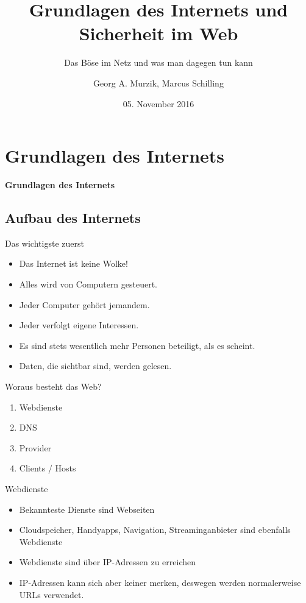 \documentclass[hyperref={colorlinks,linkcolor=white}, utf8]{beamer}
\title{Grundlagen des Internets und Sicherheit im Web}
\subtitle{Das Böse im Netz und was man dagegen tun kann} %
\author{Georg A. Murzik, Marcus Schilling}
\institute{Terminal.21}
\date{05. November 2016}
\begin{document}
	
	\begin{frame}
		\titlepage
	\end{frame}
	
	\section{Grundlagen des Internets}
	\begin{frame}
		\centering \huge \textbf{Grundlagen des Internets}
	\end{frame}
	
	\subsection{Aufbau des Internets}
	\begin{frame}{Das wichtigste zuerst}
		\begin{itemize}
			\item Das Internet ist keine Wolke!
			\item Alles wird von Computern gesteuert.
			\item Jeder Computer gehört jemandem.
			\item Jeder verfolgt eigene Interessen.
			\item Es sind stets wesentlich mehr Personen beteiligt, als es scheint.				\item Daten, die sichtbar sind, werden gelesen.	
		\end{itemize}		
	\end{frame}
	
	\begin{frame}{Woraus besteht das Web?}
		\begin{enumerate}
			\item Webdienste
			\item DNS
			\item Provider
			\item Clients / Hosts
		\end{enumerate}
	\end{frame}
		
	\begin{frame}{Webdienste}
		\begin{itemize}
			\item Bekannteste Dienste sind Webseiten
			\item Cloudspeicher, Handyapps, Navigation, Streaminganbieter sind ebenfalls Webdienste
			\item Webdienste sind über IP-Adressen zu erreichen
			\item IP-Adressen kann sich aber keiner merken, deswegen werden normalerweise URLs verwendet.
		\end{itemize}		
	\end{frame}
	
\end{document}
